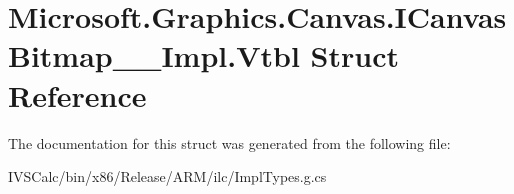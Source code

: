 \hypertarget{struct_microsoft_1_1_graphics_1_1_canvas_1_1_i_canvas_bitmap_____impl_1_1_vtbl}{}\section{Microsoft.\+Graphics.\+Canvas.\+I\+Canvas\+Bitmap\+\_\+\+\_\+\+Impl.\+Vtbl Struct Reference}
\label{struct_microsoft_1_1_graphics_1_1_canvas_1_1_i_canvas_bitmap_____impl_1_1_vtbl}


The documentation for this struct was generated from the following file\+:\begin{DoxyCompactItemize}
\item 
I\+V\+S\+Calc/bin/x86/\+Release/\+A\+R\+M/ilc/Impl\+Types.\+g.\+cs\end{DoxyCompactItemize}
